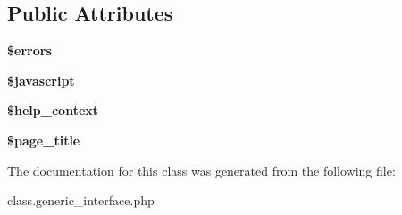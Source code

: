 \subsection*{Public Attributes}
\begin{DoxyCompactItemize}
\item 
\hypertarget{classgeneric__interface_a0fed4a23a18ce292a0d7934b809c615d}{}\label{classgeneric__interface_a0fed4a23a18ce292a0d7934b809c615d} 
{\bfseries \$errors}
\item 
\hypertarget{classgeneric__interface_a69d365bc7157d8d74366b900ce99f584}{}\label{classgeneric__interface_a69d365bc7157d8d74366b900ce99f584} 
{\bfseries \$javascript}
\item 
\hypertarget{classgeneric__interface_a0ab93db3295a794300dac66c6e48bbb7}{}\label{classgeneric__interface_a0ab93db3295a794300dac66c6e48bbb7} 
{\bfseries \$help\+\_\+context}
\item 
\hypertarget{classgeneric__interface_a3537970983f08f4fabef6acfc21762d5}{}\label{classgeneric__interface_a3537970983f08f4fabef6acfc21762d5} 
{\bfseries \$page\+\_\+title}
\end{DoxyCompactItemize}


The documentation for this class was generated from the following file\+:\begin{DoxyCompactItemize}
\item 
class.\+generic\+\_\+interface.\+php\end{DoxyCompactItemize}
